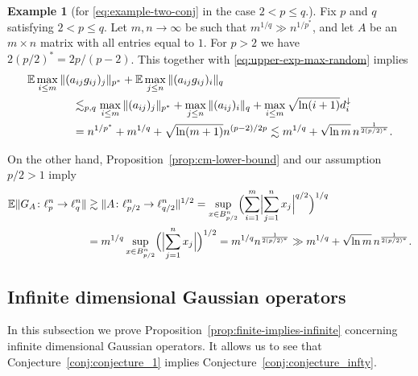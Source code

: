 \documentclass[a4paper]{amsart}
\theoremstyle{definition}
\newtheorem{example}[theorem]{Example}
\theoremstyle{remark}
\numberwithin{equation}{section}
\newcommand*{\EE}{\mathbb{E}}
\newcommand*{\rearr}{\downarrow} %
\begin{document}
\begin{example} [for \eqref{eq:example-two-conj} in the case $2<p \le q$.]
	Fix $p$ and $q$ satisfying $2<p \le q$. Let $m,n \to \infty$ be such that $m^{1/q}\gg n^{1/p^\ast}$, and let $A$ be an $m\times n$ matrix with all entries equal to $1$. 
	For $p>2$ we have $2(p/2)^\ast = 2p/(p-2)$.
	This together with \eqref{eq:upper-exp-max-random} implies
	\begin{align*}
	   \MoveEqLeft[4]
		\EE\max_{i\le m} \| (a_{ij}g_{ij})_j\|_{p^\ast} +\EE\max_{j\le n}  \| (a_{ij}g_{ij})_i\|_q 
		\\
		&\lesssim_{p,q}
		\max _{i\le m} \| (a_{ij})_j\|_{p^\ast} +\max_{j\le n}  \| (a_{ij})_i\|_q +\max_{i\le m} \sqrt{\ln(i+1)}d_i^{\rearr{}}
		\\
		& = n^{1/p^\ast} + m^{1/q} + \sqrt{\ln(m+1)}n^{(p-2)/2p} 
		\lesssim m^{1/q} + \sqrt{\ln m}\, n^{\frac1{2(p/2)^\ast}}.
	\end{align*}
	
	On the other hand, Proposition~\ref{prop:cm-lower-bound} and our assumption $p/2>1$ imply
	\begin{align*}
		 \EE \|G_A\colon \ell_{p}^n\to\ell_q^n\| 
		 &\gtrsim \|A \colon \ell_{p/2}^n \to \ell_{q /2}^n \|^{1/2} 
		 = \sup_{x\in B_{p/2}^n}  \Bigl( \sum_{i=1}^m \Bigl|\sum_{j=1}^n x_j\Bigr|^{q/2} \Bigr)^{1/q}
		\\
		&=  m^{1/q} \sup_{x\in B_{p/2}^n}  \Bigl( \Bigl|\sum_{j=1}^n x_j\Bigr| \Bigr)^{1/2}
		= m^{1/q} n^{\frac1{2(p/2)^\ast}} \gg m^{1/q} + \sqrt{\ln m} \, n^{\frac1{2(p/2)^\ast}}.
	\end{align*}
\end{example}

\subsection{Infinite dimensional Gaussian operators}		\label{subsect:infty-dim}

In this subsection we prove Proposition~\ref{prop:finite-implies-infinite} concerning infinite dimensional Gaussian operators. It allows us to see that Conjecture~\ref{conj:conjecture_1} implies Conjecture~\ref{conj:conjecture_infty}.
\end{document}
